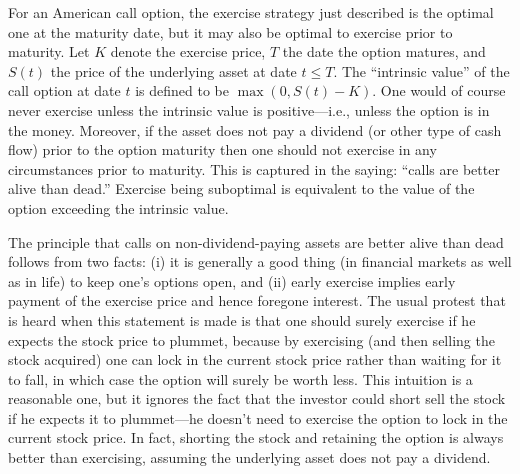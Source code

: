 For an American call option, the exercise strategy just described is the optimal one at the maturity date, but it may also be optimal to exercise prior to maturity.    Let $K$ denote the exercise price, $T$ the date the option matures, and $S(t)$ the price of the underlying asset at date $t \leq T$.  The ``intrinsic value''  of the call option at date $t$ is defined to be $\max(0,S(t)-K)$.  One would of course never exercise unless the intrinsic value is positive---i.e., unless the option is in the money.  Moreover, if the asset does not pay a dividend (or other type of cash flow) prior to the option maturity then one should not exercise in any circumstances prior to maturity.  This is captured in the saying:  ``calls are better alive than dead.''  Exercise being suboptimal is equivalent  to the value of the option exceeding the intrinsic value.

The principle that calls on non-dividend-paying assets are better alive than dead follows from two facts: (i) it is generally a good thing (in financial markets as well as in life) to keep one's options open, and (ii) early exercise implies early payment of the exercise price and hence foregone interest.  The usual protest that is heard when this statement is made is that one should surely exercise if he expects the stock price to plummet, because by exercising (and then selling the stock acquired) one can lock in the current stock price rather than waiting for it to fall, in which case the option will surely be worth less.  This intuition is a reasonable one, but it ignores the fact that the investor could short sell the stock if he expects it to plummet---he doesn't need to exercise the option to lock in the current stock price.  In fact, shorting the stock and retaining the option is always better than exercising, assuming the underlying asset does not pay a dividend.  


